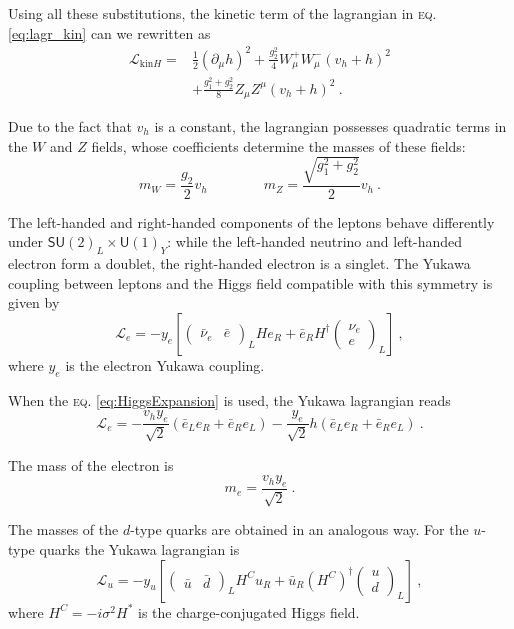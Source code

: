 \documentclass[aps,prd,preprintnumbers,nofootinbibn,twocolumn]{revtex4}
\begin{document}
Using all these substitutions, the kinetic term of the lagrangian in \textsc{eq.} \eqref{eq:lagr_kin} can we rewritten as
\begin{align}
\mathcal{L}_{\mathrm{kin}H} =& \frac{1}{2}(\partial_\mu h)^2 + \frac{g_2^2}{4} W_\mu^+ W_\mu^- (v_h + h)^2 \nonumber\\
&+ \frac{g_1^2 + g_2^2}{8}Z_\mu Z^\mu (v_h + h)^2\ . \label{eq:WZmassterm}
\end{align}

Due to the fact that $v_h$ is a constant, the lagrangian possesses quadratic terms in the $W$ and $Z$ fields, whose coefficients determine the masses of these fields:
\begin{equation}
m_W= \frac{g_2}{2} v_h \qquad\qquad m_Z = \frac{\sqrt{g_1^2 + g_2^2}}{2}v_h\ .
\end{equation}

The left-handed and right-handed components of the leptons behave differently under $\mathsf{SU}(2)_L \times \mathsf{U}(1)_Y$: while the left-handed neutrino and left-handed electron form a doublet, the right-handed electron is a singlet. The Yukawa coupling between leptons and the Higgs field compatible with this symmetry is given by
\begin{equation}
\mathcal{L}_e = - y_e \left[ \begin{pmatrix}\bar{\nu}_e & \bar{e} \end{pmatrix}_L H e_R + \bar{e}_R H^\dagger \begin{pmatrix}\nu_e\\ e\end{pmatrix}_L \right]\ , \label{eq:yukawae}
\end{equation}
where $y_e$ is the electron Yukawa coupling.

When the \textsc{eq.} \eqref{eq:HiggsExpansion} is used, the Yukawa lagrangian reads
\begin{equation}
\mathcal{L}_e = -\frac{v_h y_e}{\sqrt{2}} (\bar{e}_L e_R + \bar{e}_R e_L)- \frac{y_e}{\sqrt{2}} h (\bar{e}_L e_R + \bar{e}_R e_L) \ .
\end{equation}


The mass of the electron is
\begin{equation}
m_e = \frac{v_h y_e}{\sqrt{2}}\ .
\end{equation}

The masses of the $d$-type quarks are obtained in an analogous way. For the $u$-type quarks the Yukawa lagrangian is
\begin{equation}
\mathcal{L}_u = -y_u \left[ \begin{pmatrix}\bar{u} & \bar{d} \end{pmatrix}_L H^C u_R + \bar{u}_R (H^C)^\dagger \begin{pmatrix}u\\ d\end{pmatrix}_L \right]\ ,
\end{equation}
where $H^C = -i\sigma^2 H^*$ is the charge-conjugated Higgs field.
\end{document}
